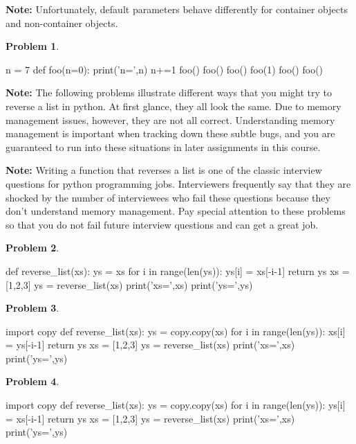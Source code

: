 \documentclass[12pt]{article}
\theoremstyle{definition}
\newtheorem{problem}{Problem}
\begin{document}
\noindent
\textbf{Note:}
Unfortunately, default parameters behave differently for container objects and non-container objects.

\begin{problem}
~~~
\begin{python}
n = 7
def foo(n=0):
    print('n=',n)
    n+=1
foo()
foo()
foo()
foo(1)
foo()
foo()
\end{python}
\end{problem}
\vspace{2in}

\newpage
\noindent
\textbf{Note:}
The following problems illustrate different ways that you might try to reverse a list in python.
At first glance, they all look the same.
Due to memory management issues, however, they are not all correct.
Understanding memory management is important when tracking down these subtle bugs,
and you are guaranteed to run into these situations in later assignments in this course.

\vspace{0.15in}
\noindent
\textbf{Note:}
Writing a function that reverses a list is one of the classic interview questions for python programming jobs.
Interviewers frequently say that they are shocked by the number of interviewees who fail these questions because they don't understand memory management.
Pay special attention to these problems so that you do not fail future interview questions and can get a great job.

\begin{problem}
~~~
\begin{python}
def reverse_list(xs):
    ys = xs
    for i in range(len(ys)):
        ys[i] = xs[-i-1]
    return ys
xs = [1,2,3]
ys = reverse_list(xs)
print('xs=',xs)
print('ys=',ys)
\end{python}
\end{problem}
\vspace{0.75in}

\begin{problem}
~~~
\begin{python}
import copy
def reverse_list(xs):
    ys = copy.copy(xs)
    for i in range(len(ys)):
        xs[i] = ys[-i-1]
    return ys
xs = [1,2,3]
ys = reverse_list(xs)
print('xs=',xs)
print('ys=',ys)
\end{python}
\end{problem}
\vspace{2in}

\newpage
\begin{problem}
~~~
\begin{python}
import copy
def reverse_list(xs):
    ys = copy.copy(xs)
    for i in range(len(ys)):
        ys[i] = xs[-i-1]
    return ys
xs = [1,2,3]
ys = reverse_list(xs)
print('xs=',xs)
print('ys=',ys)
\end{python}
\end{problem}
\vspace{2in}
\end{document}
